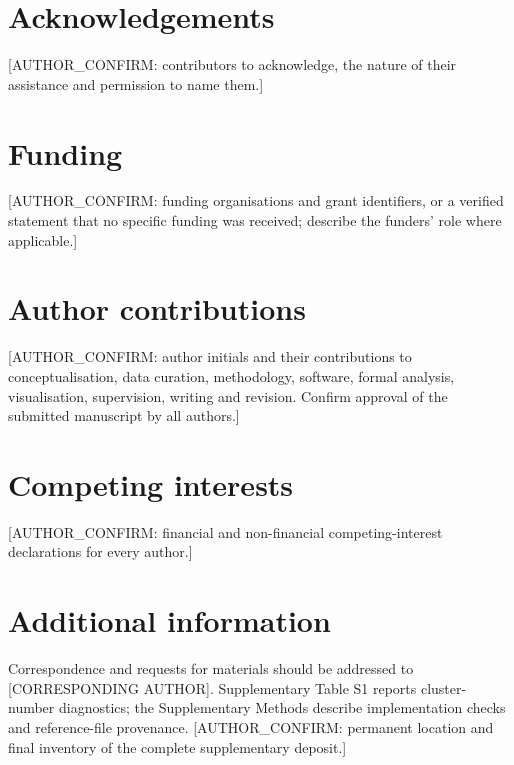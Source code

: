 \documentclass[11pt,a4paper]{article}
\begin{document}
\section*{Acknowledgements}
[AUTHOR\_CONFIRM: contributors to acknowledge, the nature of their assistance and permission to name them.]

\section*{Funding}
[AUTHOR\_CONFIRM: funding organisations and grant identifiers, or a verified statement that no specific funding was received; describe the funders' role where applicable.]

\section*{Author contributions}
[AUTHOR\_CONFIRM: author initials and their contributions to conceptualisation, data curation, methodology, software, formal analysis, visualisation, supervision, writing and revision. Confirm approval of the submitted manuscript by all authors.]

\section*{Competing interests}
[AUTHOR\_CONFIRM: financial and non-financial competing-interest declarations for every author.]

\section*{Additional information}
Correspondence and requests for materials should be addressed to [CORRESPONDING AUTHOR]. Supplementary Table S1 reports cluster-number diagnostics; the Supplementary Methods describe implementation checks and reference-file provenance. [AUTHOR\_CONFIRM: permanent location and final inventory of the complete supplementary deposit.]
\end{document}
